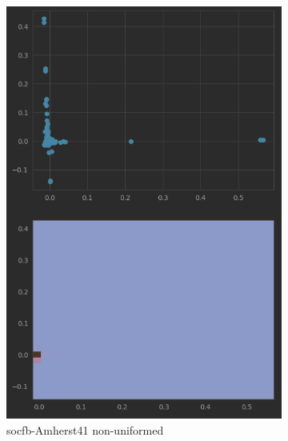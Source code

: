 \begin{figure}
    \begin{subfigure}{0.45\textwidth}
      \centering
      \includegraphics[width=\linewidth]{figures/real_diffmap_plot_nonuniformed.png}
      \caption{socfb-Amherst41 non-uniformed}
      \label{fig:sub3}
    \end{subfigure}
    \hfill
    \begin{subfigure}{0.45\textwidth}
      \centering

\end{subfigure}
\end{figure}
